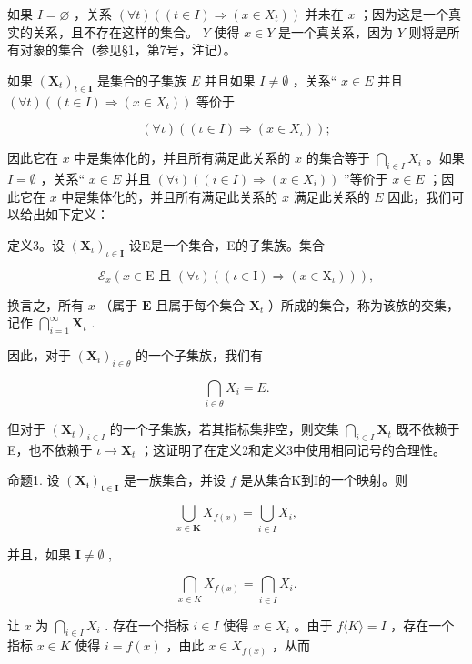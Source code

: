 如果 \(I = \varnothing\) ，关系 \((\forall t)((t \in I) \Longrightarrow (x \in X_t))\) 并未在 \(x\) ；因为这是一个真实的关系，且不存在这样的集合。 \(Y\) 使得 \(x \in Y\) 是一个真关系，因为 \(Y\) 则将是所有对象的集合（参见§1，第7号，注记）。

如果 \((\mathbf{X}_t)_{t \in \mathbf{I}}\) 是集合的子集族 \(E\) 并且如果 \(I \neq \emptyset\) ，关系“ \(x \in E\) 并且 \((\forall t)((t \in I) \Longrightarrow (x \in X_t))\) 等价于

\[
(\forall \iota) ((\iota \in I) \Longrightarrow (x \in X _ {\iota}));
\]

因此它在 \(x\) 中是集体化的，并且所有满足此关系的 \(x\) 的集合等于 \(\bigcap_{i \in I} X_i\) 。如果 \(I = \emptyset\) ，关系“ \(x \in E\) 并且 \((\forall i)((i \in I) \Longrightarrow (x \in X_i))\) ”等价于 \(x \in E\) ；因此它在 \(x\) 中是集体化的，并且所有满足此关系的 \(x\) 满足此关系的 \(E\) 因此，我们可以给出如下定义：

定义3。设 \((\mathbf{X}_{\iota})_{\iota \in \mathbf{I}}\) 设E是一个集合，E的子集族。集合

\[
\mathcal {E} _ {x} (x \in \mathrm{E} \text {   且   } (\forall \iota) ((\iota \in \mathrm{I}) \Longrightarrow (x \in \mathrm{X} _ {\iota}))),
\]

换言之，所有 \(x\) （属于 \(\mathbf{E}\) 且属于每个集合 \(\mathbf{X}_t\) ）所成的集合，称为该族的交集，记作 \(\bigcap_{i=1}^{\infty} \mathbf{X}_t\) .

因此，对于 \((\mathbf{X}_{i})_{i\in\theta}\) 的一个子集族，我们有

\[
\bigcap_ {i \in \theta} X _ {i} = E.
\]

但对于 \((\mathbf{X}_t)_{i\in I}\) 的一个子集族，若其指标集非空，则交集 \(\bigcap_{i\in I}\mathbf{X}_t\) 既不依赖于E，也不依赖于 \(\iota \to \mathbf{X}_t\) ；这证明了在定义2和定义3中使用相同记号的合理性。

命题1. 设 \((\mathbf{X}_{\mathfrak{t}})_{\mathfrak{t}\in \mathbf{I}}\) 是一族集合，并设 \(f\) 是从集合K到I的一个映射。则

\[
\bigcup_ {x \in \mathbf {K}} X _ {f (x)} = \bigcup_ {i \in I} X _ {i},
\]

并且，如果 \(\mathbf{I} \neq \emptyset\) ,

\[
\bigcap_ {x \in K} X _ {f (x)} = \bigcap_ {i \in I} X _ {i}.
\]

让 \(x\) 为 \(\bigcap_{i \in I} X_i\) . 存在一个指标 \(i \in I\) 使得 \(x \in X_i\) 。由于 \(f\langle K \rangle = I\) ，存在一个指标 \(x \in K\) 使得 \(i = f(x)\) ，由此 \(x \in X_{f(x)}\) ，从而

